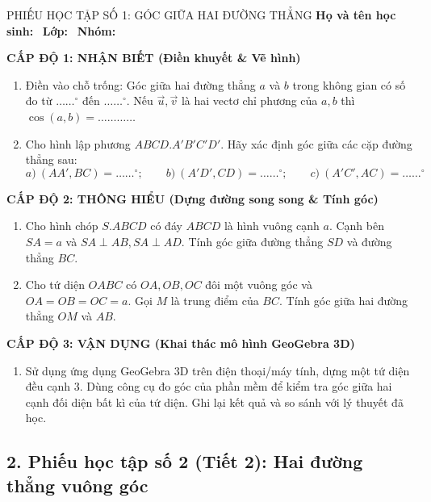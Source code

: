 \documentclass[12pt, a4paper]{article}
\renewcommand{\vec}[1]{\overrightarrow{#1}}
\begin{document}
\begin{pedabox}{PHIẾU HỌC TẬP SỐ 1: GÓC GIỮA HAI ĐƯỜNG THẲNG}
\textbf{Họ và tên học sinh:} \dotfill \ \textbf{Lớp:} \dotfill \ \textbf{Nhóm:} \dotfill

\noindent \textbf{CẤP ĐỘ 1: NHẬN BIẾT (Điền khuyết \& Vẽ hình)}
\begin{enumerate}[leftmargin=0.6cm]
    \item Điền vào chỗ trống:
    Góc giữa hai đường thẳng $a$ và $b$ trong không gian có số đo từ $\dots\dots^\circ$ đến $\dots\dots^\circ$.
    Nếu $\vec{u}, \vec{v}$ là hai vectơ chỉ phương của $a, b$ thì $\cos(a, b) = \dots\dots\dots\dots$
    \item Cho hình lập phương $ABCD.A'B'C'D'$. Hãy xác định góc giữa các cặp đường thẳng sau:
    $$a) \ (AA', BC) = \dots\dots^\circ; \qquad b) \ (A'D', CD) = \dots\dots^\circ; \qquad c) \ (A'C', AC) = \dots\dots^\circ$$
\end{enumerate}

\noindent \textbf{CẤP ĐỘ 2: THÔNG HIỂU (Dựng đường song song \& Tính góc)}
\begin{enumerate}[leftmargin=0.6cm]
    \item Cho hình chóp $S.ABCD$ có đáy $ABCD$ là hình vuông cạnh $a$. Cạnh bên $SA = a$ và $SA \perp AB, SA \perp AD$.
    Tính góc giữa đường thẳng $SD$ và đường thẳng $BC$.
    \item Cho tứ diện $OABC$ có $OA, OB, OC$ đôi một vuông góc và $OA = OB = OC = a$. Gọi $M$ là trung điểm của $BC$.
    Tính góc giữa hai đường thẳng $OM$ và $AB$.
\end{enumerate}

\noindent \textbf{CẤP ĐỘ 3: VẬN DỤNG (Khai thác mô hình GeoGebra 3D)}
\begin{enumerate}[leftmargin=0.6cm]
    \item Sử dụng ứng dụng GeoGebra 3D trên điện thoại/máy tính, dựng một tứ diện đều cạnh $3$. Dùng công cụ đo góc của phần mềm để kiểm tra góc giữa hai cạnh đối diện bất kì của tứ diện. Ghi lại kết quả và so sánh với lý thuyết đã học.
\end{enumerate}
\end{pedabox}

\subsection*{2. Phiếu học tập số 2 (Tiết 2): Hai đường thẳng vuông góc}
\end{document}

